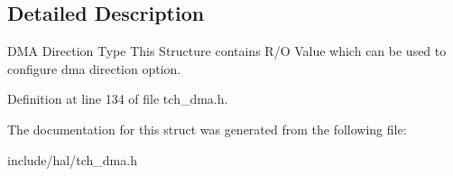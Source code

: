 \subsection{Detailed Description}
D\+M\+A Direction Type This Structure contains R/\+O Value which can be used to configure dma direction option. 

Definition at line 134 of file tch\+\_\+dma.\+h.



The documentation for this struct was generated from the following file\+:\begin{DoxyCompactItemize}
\item 
include/hal/tch\+\_\+dma.\+h\end{DoxyCompactItemize}
